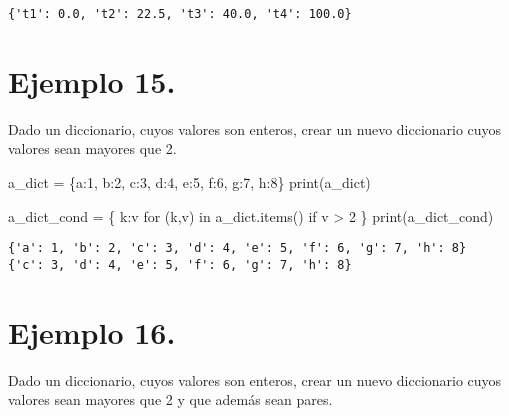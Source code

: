 \documentclass[
  letterpaper,
  DIV=11,
  numbers=noendperiod]{scrreprt}
\newenvironment{Shaded}{\begin{snugshade}}{\end{snugshade}}
\newcommand{\BuiltInTok}[1]{\textcolor[rgb]{0.00,0.23,0.31}{#1}}
\newcommand{\ControlFlowTok}[1]{\textcolor[rgb]{0.00,0.23,0.31}{#1}}
\newcommand{\DecValTok}[1]{\textcolor[rgb]{0.68,0.00,0.00}{#1}}
\newcommand{\KeywordTok}[1]{\textcolor[rgb]{0.00,0.23,0.31}{#1}}
\newcommand{\NormalTok}[1]{\textcolor[rgb]{0.00,0.23,0.31}{#1}}
\newcommand{\OperatorTok}[1]{\textcolor[rgb]{0.37,0.37,0.37}{#1}}
\newcommand{\StringTok}[1]{\textcolor[rgb]{0.13,0.47,0.30}{#1}}
\begin{document}
\begin{verbatim}
{'t1': 0.0, 't2': 22.5, 't3': 40.0, 't4': 100.0}
\end{verbatim}

\section{\texorpdfstring{\textbf{Ejemplo
15.}}{Ejemplo 15.}}\label{ejemplo-15.-1}

Dado un diccionario, cuyos valores son enteros, crear un nuevo
diccionario cuyos valores sean mayores que 2.

\begin{Shaded}
\begin{Highlighting}[]
\NormalTok{a\_dict }\OperatorTok{=}\NormalTok{ \{}\StringTok{\textquotesingle{}a\textquotesingle{}}\NormalTok{:}\DecValTok{1}\NormalTok{, }\StringTok{\textquotesingle{}b\textquotesingle{}}\NormalTok{:}\DecValTok{2}\NormalTok{, }\StringTok{\textquotesingle{}c\textquotesingle{}}\NormalTok{:}\DecValTok{3}\NormalTok{, }\StringTok{\textquotesingle{}d\textquotesingle{}}\NormalTok{:}\DecValTok{4}\NormalTok{, }\StringTok{\textquotesingle{}e\textquotesingle{}}\NormalTok{:}\DecValTok{5}\NormalTok{, }\StringTok{\textquotesingle{}f\textquotesingle{}}\NormalTok{:}\DecValTok{6}\NormalTok{, }\StringTok{\textquotesingle{}g\textquotesingle{}}\NormalTok{:}\DecValTok{7}\NormalTok{, }\StringTok{\textquotesingle{}h\textquotesingle{}}\NormalTok{:}\DecValTok{8}\NormalTok{\}}
\BuiltInTok{print}\NormalTok{(a\_dict)}

\NormalTok{a\_dict\_cond }\OperatorTok{=}\NormalTok{ \{ k:v }\ControlFlowTok{for}\NormalTok{ (k,v) }\KeywordTok{in}\NormalTok{ a\_dict.items() }\ControlFlowTok{if}\NormalTok{ v }\OperatorTok{\textgreater{}} \DecValTok{2}\NormalTok{ \}}
\BuiltInTok{print}\NormalTok{(a\_dict\_cond)}
\end{Highlighting}
\end{Shaded}

\begin{verbatim}
{'a': 1, 'b': 2, 'c': 3, 'd': 4, 'e': 5, 'f': 6, 'g': 7, 'h': 8}
{'c': 3, 'd': 4, 'e': 5, 'f': 6, 'g': 7, 'h': 8}
\end{verbatim}

\section{\texorpdfstring{\textbf{Ejemplo
16.}}{Ejemplo 16.}}\label{ejemplo-16.-1}

Dado un diccionario, cuyos valores son enteros, crear un nuevo
diccionario cuyos valores sean mayores que 2 y que además sean pares.
\end{document}
